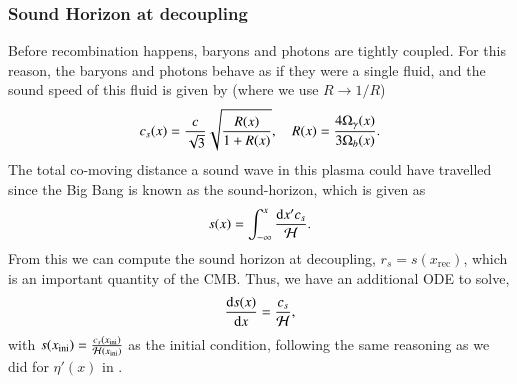 \subsubsection{Sound Horizon at decoupling} \label{sssec:M2:sound_horizon}
Before recombination happens, baryons and photons are tightly coupled. For this reason, the baryons and photons behave as if they were a single fluid, and the sound speed of this fluid is given by \cite[Eq. (9.21)]{Dodelson} (where we use $R\to 1/R$)
\begin{equation} \label{eq:M2:theory:soundspeed_R_baryons_and_photons}
    c_s(x) = \frac{c}{\sqrt{3}} \sqrt{\frac{R(x)}{1+R(x)}},\quad R(x) = \frac{4\Omega_{\gamma}(x)}{3\Omega_b(x)}.
\end{equation}
The total co-moving distance a sound wave in this plasma could have travelled since the Big Bang is known as the sound-horizon, which is given as 
\begin{equation} \label{eq:M2:theory:sound_horizon_integral}
    s(x)=\int_{-\infty}^x \frac{\dd x' c_s}{\mathcal{H}}.
\end{equation}
From this we can compute the sound horizon at decoupling, $r_s = s(x_\mathrm{rec})$, which is an important quantity of the CMB. Thus, we have an additional ODE to solve, 
\begin{equation} \label{eq:M2:theory:sound_horizon_ODE}
    \dv{s(x)}{x} = \frac{c_s}{\mathcal{H}},
\end{equation}
with $s(x_\mathrm{ini})=\frac{c_s(x_\mathrm{ini})}{\mathcal{H}(x_\mathrm{ini})}$ as the initial condition, following the same reasoning as we did for $\eta'(x)$ in .
